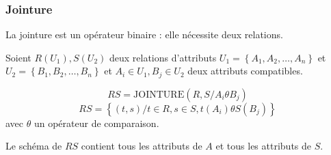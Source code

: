 \documentclass[10pt]{article}
\begin{document}
            \subsubsection{Jointure}
                La jointure est un opérateur binaire : elle nécessite deux relations.

                Soient $R(U_1), S(U_2)$ deux relations d'attributs $U_1=\left\{A_1,A_2,\dots,A_n\right\}$ et $U_2=\left\{B_1,B_2,\dots,B_n\right\}$ et $A_i\in U_1, B_j\in U_2$ deux attributs compatibles.

                $$RS=\mathrm{JOINTURE}(R,S/A_i\theta B_j)$$
                $$RS=\left\{(t,s)/t\in R, s\in S,t(A_i)\theta S(B_j)\right\}$$
                avec $\theta$ un opérateur de comparaison.

                Le schéma de $RS$ contient tous les attributs de $A$ et tous les attributs de $S$.
\end{document}
